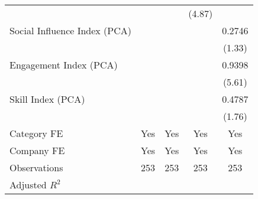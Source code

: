 {\begin{tabular}{l*{4}{c}}
                                   &                   &                   &    (4.87)         &                   \\
[1em]
Social Influence Index (PCA)       &                   &                   &                   &    0.2746         \\
                                   &                   &                   &                   &    (1.33)         \\
[1em]
Engagement Index (PCA)             &                   &                   &                   &    0.9398\sym{***}\\
                                   &                   &                   &                   &    (5.61)         \\
[1em]
Skill Index (PCA)                  &                   &                   &                   &    0.4787\sym{*}  \\
                                   &                   &                   &                   &    (1.76)         \\
[1em]
Category FE                        &       Yes         &       Yes         &       Yes         &       Yes         \\
[1em]
Company FE                         &       Yes         &       Yes         &       Yes         &       Yes         \\
\hline
Observations                       &       253         &       253         &       253         &       253         \\
Adjusted \(R^{2}\)                 &                   &                   &                   &                   \\
\hline\hline
\end{tabular}
}
